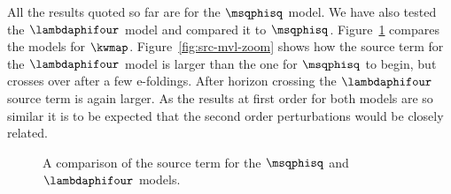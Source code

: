 All the results quoted so far are for
the $\msqphisq$ model. We have also tested the $\lambdaphifour$ model and
compared it to
$\msqphisq$. Figure~\ref{fig:src-mvl-main} compares the models for $\kwmap$.
Figure~\ref{fig:src-mvl-zoom} shows how the source term for the $\lambdaphifour$
model is larger
than the one for $\msqphisq$ to begin, but crosses over after a few e-foldings.
After horizon
crossing the $\lambdaphifour$ source term is again larger. As the results at
first order for both
models are so similar it is to be expected that the second order perturbations
would be closely
related. 
% 
\begin{figure}
% 
\caption{A comparison of the source term for the $\msqphisq$ and
$\lambdaphifour$ models.}
\label{fig:src-mvl-main}
\end{figure}
% 

